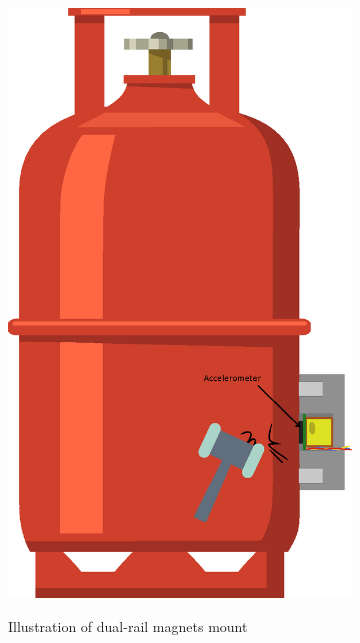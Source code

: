 \begin{figure}[]
    \centering
    \begin{subfigure}{0.3\textwidth}
        \centering
        \includegraphics[width=\linewidth]{Chapters/4CHP/Figures/AccMagnets.eps}
        \caption{Illustration of dual-rail magnets mount}{}
        \label{subfig:mounMagnetDual}
    \end{subfigure}
    \begin{subfigure}{0.3\textwidth}
        \centering

\end{subfigure}
\end{figure}
